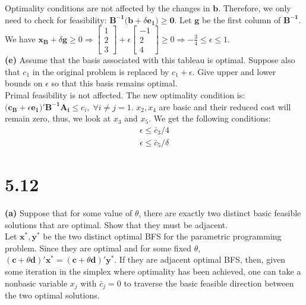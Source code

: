 \documentclass{article}
\begin{document}
\noindent 
Optimality conditions are not affected by the changes in $\mathbf{b}$.  Therefore, we only need to check for feasibility:  $\mathbf{B^{-1}(b } + \delta \mathbf{e_1) \geq 0}$.  Let $\mathbf{g}$ be the first column of $\mathbf{B^{-1}}$.  \\
We have $\mathbf{x_B} + \delta \mathbf{g} \geq 0 \Rightarrow 
\begin{bmatrix}
1 \\
2 \\
3
\end{bmatrix}
+ \epsilon
\begin{bmatrix}
-1 \\
2 \\
4
\end{bmatrix}
\geq 0
\Rightarrow - \frac{3}{4} \leq \epsilon \leq 1 $. \\

\noindent
\textbf{(e)}  Assume that the basis associated with this tableau is optimal.  Suppose also that $c_1$ in the original problem is replaced by $c_1 + \epsilon$.  Give upper and lower bounds on $\epsilon$ so that this basis remains optimal. \\

\noindent
Primal feasibility is not affected.  The new optimality condition is:  $(\mathbf{c_B} + \epsilon \mathbf{e_1)' B^{-1} A_i \leq } c_i, \; \forall i \neq j = 1$. $x_2, x_4$ are basic and their reduced cost will remain zero, thus, we look at $x_3$ and $x_5.$ We get the following conditions: \\
\begin{equation*}
\begin{aligned}
\epsilon \leq \bar{c}_3 / {4} \\
\epsilon \leq \bar{c}_5 / \delta
\end{aligned}
\end{equation*}

\section*{5.12}
\textbf{(a)}  Suppose that for some value of $\theta$, there are exactly two distinct basic feasible solutions that are optimal.  Show that they must be adjacent.  \\

\noindent
Let $ \mathbf{x^*, y^*}$ be the two distinct optimal BFS for the parametric programming problem.  Since they are optimal and for some fixed $\theta$, $(\mathbf{c} + \theta \mathbf{d})\mathbf{' x^*} = (\mathbf{c} + \theta \mathbf{d})\mathbf{' y^*}$.  If they are adjacent optimal BFS, then, given some iteration in the simplex where optimality has been achieved, one can take a nonbasic variable $x_j$ with $\bar{c}_j = 0$ to traverse the basic feasible direction between the two optimal solutions.  \\
\end{document}
